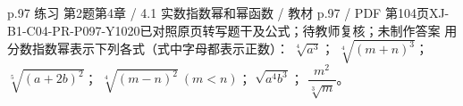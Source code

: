 \par\noindent\begin{minipage}{\linewidth}
\begin{bankitem}{p.97 练习 第2题}{第4章 / 4.1 实数指数幂和幂函数 / 教材 p.97 / PDF 第104页}{XJ-B1-C04-PR-P097-Y1020}{已对照原页转写题干及公式；待教师复核；未制作答案}
用分数指数幂表示下列各式（式中字母都表示正数）：
$\sqrt[4]{a^3}$；
$\sqrt[4]{(m+n)^3}$；
$\sqrt[5]{(a+2b)^2}$；
$\sqrt[4]{(m-n)^2}\ (m<n)$；
$\sqrt{a^4b^3}$；
$\dfrac{m^2}{\sqrt[3]m}$。
\end{bankitem}
\end{minipage}\par\medskip
